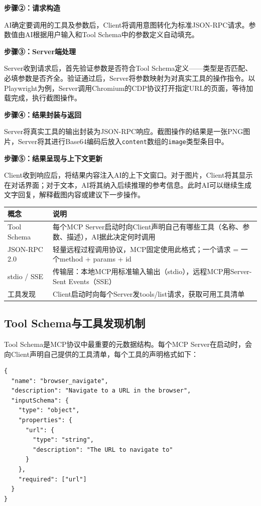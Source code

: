\textbf{步骤②：请求构造}

AI确定要调用的工具及参数后，Client将调用意图转化为标准JSON-RPC请求。参数值由AI根据用户输入和Tool Schema中的参数定义自动填充。

\textbf{步骤③：Server端处理}

Server收到请求后，首先验证参数是否符合Tool Schema定义——类型是否匹配、必填参数是否齐全。验证通过后，Server将参数映射为对真实工具的操作指令。以Playwright为例，Server调用Chromium的CDP协议打开指定URL的页面，等待加载完成，执行截图操作。

\textbf{步骤④：结果封装与返回}

Server将真实工具的输出封装为JSON-RPC响应。截图操作的结果是一张PNG图片，Server将其进行Base64编码后放入\texttt{content}数组的\texttt{image}类型条目中。

\textbf{步骤⑤：结果呈现与上下文更新}

Client收到响应后，将结果内容注入AI的上下文窗口。对于图片，Client将其显示在对话界面；对于文本，AI将其纳入后续推理的参考信息。此时AI可以继续生成文字回复，解释截图内容或建议下一步操作。

\begin{table}[H]
\centering
\begin{tabular}{lp{10cm}}
\toprule
\textbf{概念} & \textbf{说明} \\
\midrule
Tool Schema & 每个MCP Server启动时向Client声明自己有哪些工具（名称、参数、描述），AI据此决定何时调用 \\
JSON-RPC 2.0 & 轻量远程过程调用协议，MCP固定使用此格式；一个请求 = 一个method + params + id \\
stdio / SSE & 传输层：本地MCP用标准输入输出（stdio），远程MCP用Server-Sent Events（SSE） \\
工具发现 & Client启动时向每个Server发tools/list请求，获取可用工具清单 \\
\bottomrule
\end{tabular}
\end{table}

\subsection{Tool Schema与工具发现机制}

Tool Schema是MCP协议中最重要的元数据结构。每个MCP Server在启动时，会向Client声明自己提供的工具清单，每个工具的声明格式如下：

\begin{lstlisting}[style=json]
{
  "name": "browser_navigate",
  "description": "Navigate to a URL in the browser",
  "inputSchema": {
    "type": "object",
    "properties": {
      "url": {
        "type": "string",
        "description": "The URL to navigate to"
      }
    },
    "required": ["url"]
  }
}
\end{lstlisting}

